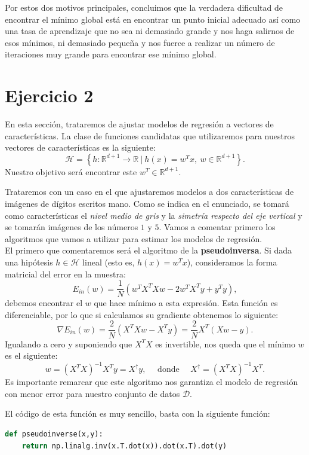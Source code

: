 \documentclass[12pt]{scrartcl}
\begin{document}
{Por estos dos motivos principales, concluimos que la verdadera dificultad de encontrar el mínimo global está en encontrar un punto inicial adecuado así como una tasa de aprendizaje que no sea ni demasiado grande y nos haga salirnos de esos mínimos, ni demasiado pequeña y nos fuerce
a realizar un número de iteraciones muy grande para encontrar ese mínimo global.

\newpage 

\section*{Ejercicio 2}

En esta sección, trataremos de ajustar modelos de regresión a vectores de características. La clase de funciones candidatas que utilizaremos para nuestros vectores de características es la siguiente:
$$
\mathcal H = \left\{ h : \mathbb R^{d+1} \to \mathbb R \ | \ h(x)= w^T x, \ w \in \mathbb R^{d+1}\right\}.
$$
Nuestro objetivo será encontrar este $w^T \in \mathbb R^{d+1}$. 


Trataremos con un caso en el que ajustaremos modelos a dos características
de imágenes de dígitos escritos mano. Como se indica en el enunciado, se tomará como características el \emph{nivel medio de gris} y la \emph{simetría respecto del eje vertical} y se tomarán imágenes de los
números $1$ y $5$. Vamos a comentar primero los algoritmos que vamos a utilizar para estimar los modelos de regresión.\\ 


El primero que comentaremos será el algoritmo de la \textbf{pseudoinversa}. Si dada una hipótesis $h \in \mathcal H$ lineal (esto es, $h(x) = w^T x$), consideramos la forma matricial del error en la muestra:
$$
E_{in}(w) = \frac{1}{N} \left(  w^T X^T X w - 2w^T X^T y + y^T y\right),
$$
debemos encontrar el $w$ que hace mínimo a esta expresión. Esta función es diferenciable, por lo que si calculamos su gradiente obtenemos lo siguiente:
$$
\nabla E_{in}(w) = \frac{2}{N} \left( X^T X w - X^T y\right) = \frac{2}{N} X^T \left(  X w -  y\right).
$$
Igualando a cero y suponiendo que $X^T X$ es invertible, nos queda que el mínimo $w$ es el siguiente:
$$
w = \left(X^T X\right)^{-1} X^T y = X^\dagger y, \quad \text{ donde } \quad X^\dagger = \left(X^T X\right)^{-1} X^T.
$$
Es importante remarcar que este algoritmo nos garantiza el modelo de regresión con menor error para nuestro conjunto de datos $\mathcal D$. 

El código de esta función es muy sencillo, basta con la siguiente función:
\begin{lstlisting}[language=Python]
def pseudoinverse(x,y):
	return np.linalg.inv(x.T.dot(x)).dot(x.T).dot(y)
\end{lstlisting}

}
\end{document}
